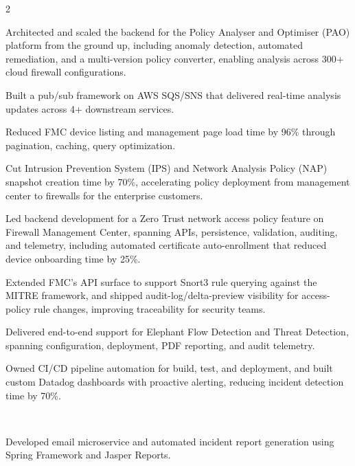 \documentclass[]{hieudo-build}
\begin{document}
\begin{paracol}{2}
\begin{tightemize}
 \item Architected and scaled the backend for the Policy Analyser and Optimiser (PAO) platform from the ground up, including anomaly detection, automated remediation, and a multi-version policy converter, enabling analysis across 300+ cloud firewall configurations.
 \item Built a pub/sub framework on AWS SQS/SNS that delivered real-time analysis updates across 4+ downstream services.
 \item Reduced FMC device listing and management page load time by 96\% through pagination, caching, query optimization.
 \item Cut Intrusion Prevention System (IPS) and Network Analysis Policy (NAP) snapshot creation time by 70\%, accelerating policy deployment from management center to firewalls for the enterprise customers.
 \item Led backend development for a Zero Trust network access policy feature on Firewall Management Center, spanning APIs, persistence, validation, auditing, and telemetry, including automated certificate auto-enrollment that reduced device onboarding time by 25\%.
 \item Extended FMC's API surface to support Snort3 rule querying against the MITRE framework, and shipped audit-log/delta-preview visibility for access-policy rule changes, improving traceability for security teams.
 \item Delivered end-to-end support for Elephant Flow Detection and Threat Detection, spanning configuration, deployment, PDF reporting, and audit telemetry.
 \item Owned CI/CD pipeline automation for build, test, and deployment, and built custom Datadog dashboards with proactive alerting, reducing incident detection time by 70\%.
\end{tightemize}
\sectionsep

\\

\begin{tightemize}
 \item Developed email microservice and automated incident report generation using Spring Framework and Jasper Reports.
\end{tightemize}
\sectionsep 

\\


\end{paracol}
\end{document}
